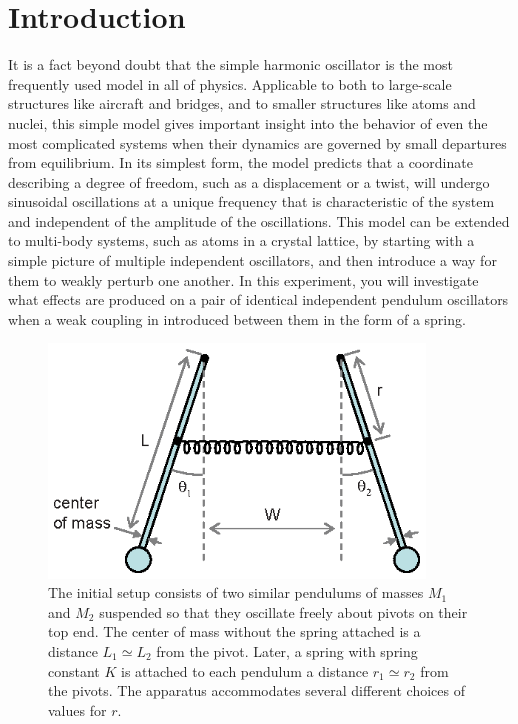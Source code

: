 \documentclass{revtex4}
\begin{document}
\section{Introduction}

It is a fact beyond doubt that the simple harmonic oscillator is the most
frequently used model in all of physics.  Applicable to both to large-scale
structures like aircraft and bridges, and to smaller structures like
atoms and nuclei, this simple model gives important insight into the
behavior of even the most complicated systems when their dynamics are
governed by small departures from equilibrium.  In its simplest form,
the model predicts that a coordinate describing a degree of freedom, such
as a displacement or a twist, will undergo sinusoidal oscillations at a
unique frequency that is characteristic of the system and independent of
the amplitude of the oscillations.  This model can be extended to
multi-body systems, such as atoms in a crystal lattice, by starting with
a simple picture of multiple independent oscillators, and then introduce
a way for them to weakly perturb one another. In this experiment, you
will investigate what effects are produced on a pair of identical
independent pendulum oscillators when a weak coupling in introduced
between them in the form of a spring.

\begin{figure}
\includegraphics[width=10cm]{2pendulumsfig.eps}
\caption{\label{2pendulumsfig} 
The initial setup consists of two similar pendulums of masses $M_1$
and $M_2$ suspended so that they oscillate freely about pivots on their
top end.  The center of mass without the spring attached is a distance
$L_1 \simeq L_2$ from the pivot.  Later, a spring with spring constant
$K$ is attached to each pendulum a distance $r_1\simeq r_2$ from the pivots.
The apparatus accommodates several different choices of values for $r$.}
\end{figure}
\end{document}
